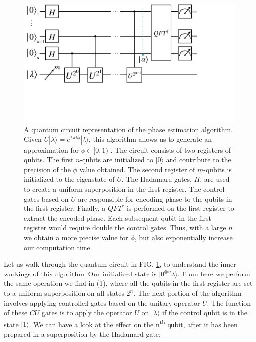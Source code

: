 \documentclass[twocolumn,showpacs,preprintnumbers,amsmath,amssymb]{revtex4}
\begin{document}
	    
		\begin{figure}[!h]
			\centering
			\includegraphics[trim={1cm 12cm 11cm 0},clip, width=0.99 \linewidth]{"graphics/phase_circ"}
			\caption{A quantum circuit representation of the phase estimation algorithm. Given $ U |\lambda \rangle = e^{2\pi i \phi} |\lambda \rangle $, this algorithm allows us to generate an  approximation for $\phi \in [0,1)$ . The circuit consists of two registers of qubits. The first $n$-qubits are initialized to $|0\rangle$ and contribute to the precision of the $\phi$ value obtained. The second register of $m$-qubits is initialized to the eigenstate of $U$.  The Hadamard gates, $H$, are used to create a uniform superposition in the first register. The control gates based on $U$ are responsible for encoding phase to the qubits in the first register. Finally, a $QFT^\dagger$ is performed on the first register to extract the encoded phase. Each subsequent qubit in the first register would require double the control gates. Thus, with a large $n$ we obtain a more precise value for $\phi$, but also exponentially increase our computation time.}
			\label{fig:phasrcircuit}
		\end{figure}
		
		
		Let us walk through the quantum circuit in FIG. \ref{fig:phasrcircuit}, to understand the inner workings of this algorithm.	 Our initialized state is $|0^{\otimes n} \lambda\rangle$. From here we perform the same operation we find in (1), where all the qubits in the first register are set to a uniform superposition on all states $2^n$. The next portion of the algorithm involves applying controlled gates based on the unitary operator $U$. The function of these $CU$ gates is to apply the operator $U$ on $|\lambda\rangle$ if the control qubit is in the state $|1\rangle$. We can have a look at the effect on the n\textsuperscript{th} qubit, after it has been prepared in a superposition by the Hadamard gate:
		
\end{document}
